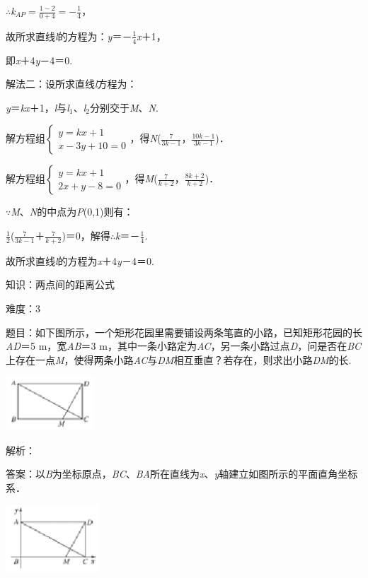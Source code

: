 \documentclass{article} %
\begin{document}
$\mathrm{\therefore}$\textit{k}${}_{AP}=\frac{1-2}{0+4}=-\frac{1}{4}$，

故所求直线\textit{l}的方程为：\textit{y}＝－$\frac{1}{4}$\textit{x}＋1，

即\textit{x}＋4\textit{y}－4＝0.

解法二：设所求直线\textit{l}方程为：

\textit{y}＝\textit{kx}＋1，\textit{l}与\textit{l}${}_{1}$、\textit{l}${}_{2}$分别交于\textit{M}、\textit{N}.

解方程组$\left\{\begin{array}{l} y=kx+1\\ x-3y+10=0 \end{array}\right.$，得\textit{N}($\frac{7}{3k-1}$，$\frac{10k-1}{3k-1}$)．

解方程组$\left\{\begin{array}{l} 	y=kx+1\\ 	2x+y-8=0 \end{array}\right.$，得\textit{M}($\frac{7}{k+2}$，$\frac{8k+2}{k+2}$)．

$\mathrm{\because}$\textit{M}、\textit{N}的中点为\textit{P}(0,1)则有：

$\frac{1}{2}$($\frac{7}{3k-1}$＋$\frac{7}{k+2}$)＝0，解得$\mathrm{\therefore}$\textit{k}＝－$\frac{1}{4}$.

故所求直线\textit{l}的方程为\textit{x}＋4\textit{y}－4＝0.



知识：两点间的距离公式

难度：3

题目：如下图所示，一个矩形花园里需要铺设两条笔直的小路，已知矩形花园的长\textit{AD}＝5 m，宽\textit{AB}＝3 m，其中一条小路定为\textit{AC}，另一条小路过点\textit{D}，问是否在\textit{BC}上存在一点\textit{M}，使得两条小路\textit{AC}与\textit{DM}相互垂直？若存在，则求出小路\textit{DM}的长.

\includegraphics*[width=1.31in, height=0.79in, keepaspectratio=false]{image285}

解析：

答案：以\textit{B}为坐标原点，\textit{BC}、\textit{BA}所在直线为\textit{x}、\textit{y}轴建立如图所示的平面直角坐标系．

\includegraphics*[width=1.37in, height=1.00in, keepaspectratio=false]{image286}
\end{document}
